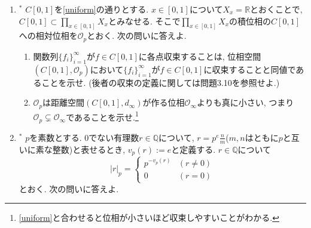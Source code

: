 \documentclass[dvipdfmx,a4paper,11pt]{article}
\newcommand{\R}{\mathbb{R}}
\newcommand{\Q}{\mathbb{Q}}
\theoremstyle{definition}
\begin{document}
\begin{enumerate}[label=\textbf{問}10.\arabic*]
\item $^{*}$ $C[0,1]$を\ref{uniform}の通りとする. $x \in [0,1]$について$X_x = \R$とおくことで, 
$C[0,1] \subset \prod_{x \in [0,1]} X_{x}$とみなせる. そこで$\prod_{x \in [0,1]} X_{x}$の積位相の$C[0,1]$への相対位相を$\mathscr{O}_p$とおく. 次の問いに答えよ.
\begin{enumerate}
\setlength{\parskip}{0cm}
  \setlength{\itemsep}{2pt} 
\item 関数列$\{ f_{i}\}_{i=1}^{\infty}$が$f \in C[0,1]$に各点収束することは, 位相空間$(C[0,1], \mathscr{O}_p)$において$\{ f_{i}\}_{i=1}^{\infty}$が$f \in C[0,1]$に収束することと同値であることを示せ. (後者の収束の定義に関しては問題3.10を参照せよ.)
\item $\mathscr{O}_p$は距離空間$(C[0,1],d_{\infty})$が作る位相$\mathscr{O}_{\infty}$よりも真に小さい, つまり$\mathscr{O}_p\subsetneq \mathscr{O}_{\infty}$であることを示せ.\footnote{\ref{uniform}と合わせると位相が小さいほど収束しやすいことがわかる.}
\end{enumerate}



\item $^{*}$ $p$を素数とする. 
0でない有理数$r \in \Q$について, $r=p^e\frac{n}{m}$($m,n$はともに$p$と互いに素な整数)と表せるとき, $v_{p}(r):=e$と定義する.
$r \in \Q$について
$$|r|_{p}= \begin{cases} p^{- v_{p}(r)}& (r\neq 0)\\0& (r=0)\end{cases}
$$
とおく. 次の問いに答えよ.


\end{enumerate}
\end{document}
